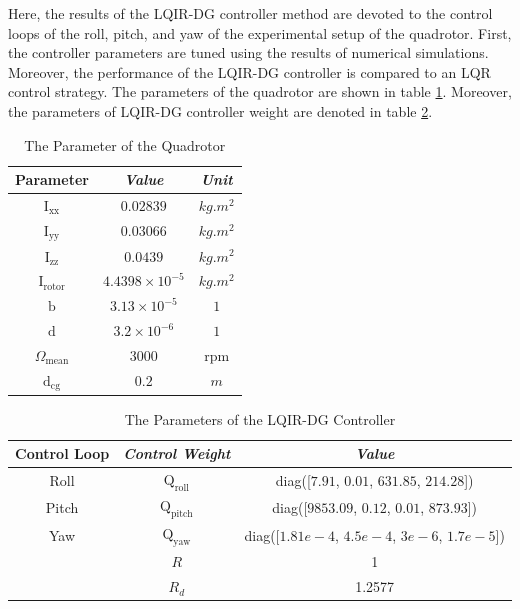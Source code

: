 \documentclass[conference]{IEEEtran}
\begin{document}
\noindent Here, the results of the LQIR-DG controller method are devoted to the control loops of the roll, pitch, and yaw of the experimental setup of the quadrotor. First, the controller parameters are tuned using the results of numerical simulations. Moreover, the performance of the LQIR-DG controller is compared to an LQR control strategy. The parameters of the quadrotor are shown in table \ref{tab:parameters}.
Moreover, the parameters of LQIR-DG controller weight are denoted in table \ref{tab:control weight_new}.
\begin{table}[!h]
	\renewcommand{\arraystretch}{1.3}
	\caption{The Parameter of the Quadrotor}
	\begin{center}
	\begin{tabular}{c c c}
	\hline
	\textbf{Parameter} & \textbf{\textit{Value}}& \textbf{\textit{Unit}} \\
	\hline
	$\mathrm{I}_{\text{xx}}$ & $0.02839$ & $kg.m^2$ \\
	$\mathrm{I}_{\text{yy}}$  & $0.03066$ & $kg.m^2$\\
	$\mathrm{I}_{\text{zz}}$  & $0.0439$ & $kg.m^2$ \\
	$\mathrm{I}_{\text{rotor}}$  & $4.4398\times 10^{-5}$ & $kg.m^2$\\
	$\mathrm{b}$  & $3.13\times10^{-5}$ & $1$ \\
	$\mathrm{d}$  & $3.2\times10^{-6}$ & $1$\\
	$\Omega_{\text{mean}}$ & $3000$ & rpm \\
	$\mathrm{d}_{\text{cg}}$  & $0.2$ & $m$\\
	\hline
	\end{tabular}
	\label{tab:parameters}
	\end{center}
\end{table}


\begin{table}[!h]
	\renewcommand{\arraystretch}{1.3}
	\caption{The Parameters of the LQIR-DG Controller}
	\begin{center}
	\begin{tabular}{c c c}
	\hline
	\textbf{Control Loop} & \textbf{\textit{Control Weight}}& \textbf{\textit{Value}} \\
	\hline
	Roll & 
	$\boldsymbol{{\mathrm{Q_{\text{roll}}}}}$ & diag([$7.91$, $0.01$, $631.85$, $214.28$])\\
	Pitch & 
	$\boldsymbol{{\mathrm{Q_{\text{pitch}}}}}$ & diag([$9853.09$, $0.12$, $0.01$, $873.93$])\\
	Yaw & 
	$\boldsymbol{{\mathrm{Q_{\text{yaw}}}}}$ & diag([$1.81e\!-\!4$, $4.5e\!-\!4$, $3e\!-\!6$, $1.7e\!-\!5$])\\
	& $R$ & 1\\
	& $R_{d}$ & 1.2577\\
	\hline
	\end{tabular}
	\end{center}
	\label{tab:control weight_new}
\end{table}
\end{document}
